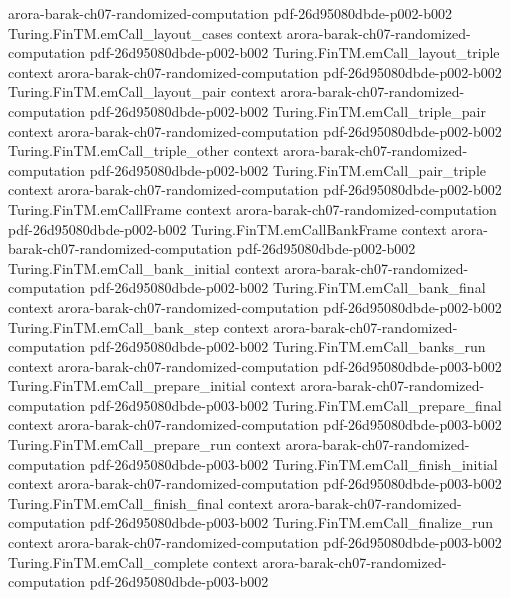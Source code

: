 \begin{theorem}
  {arora-barak-ch07-randomized-computation}
  {pdf-26d95080dbde-p002-b002}
\proofstep
  {Turing.FinTM.emCall_layout_cases}
  {context}
  {arora-barak-ch07-randomized-computation}
  {pdf-26d95080dbde-p002-b002}
\proofstep
  {Turing.FinTM.emCall_layout_triple}
  {context}
  {arora-barak-ch07-randomized-computation}
  {pdf-26d95080dbde-p002-b002}
\proofstep
  {Turing.FinTM.emCall_layout_pair}
  {context}
  {arora-barak-ch07-randomized-computation}
  {pdf-26d95080dbde-p002-b002}
\proofstep
  {Turing.FinTM.emCall_triple_pair}
  {context}
  {arora-barak-ch07-randomized-computation}
  {pdf-26d95080dbde-p002-b002}
\proofstep
  {Turing.FinTM.emCall_triple_other}
  {context}
  {arora-barak-ch07-randomized-computation}
  {pdf-26d95080dbde-p002-b002}
\proofstep
  {Turing.FinTM.emCall_pair_triple}
  {context}
  {arora-barak-ch07-randomized-computation}
  {pdf-26d95080dbde-p002-b002}
\proofstep
  {Turing.FinTM.emCallFrame}
  {context}
  {arora-barak-ch07-randomized-computation}
  {pdf-26d95080dbde-p002-b002}
\proofstep
  {Turing.FinTM.emCallBankFrame}
  {context}
  {arora-barak-ch07-randomized-computation}
  {pdf-26d95080dbde-p002-b002}
\proofstep
  {Turing.FinTM.emCall_bank_initial}
  {context}
  {arora-barak-ch07-randomized-computation}
  {pdf-26d95080dbde-p002-b002}
\proofstep
  {Turing.FinTM.emCall_bank_final}
  {context}
  {arora-barak-ch07-randomized-computation}
  {pdf-26d95080dbde-p002-b002}
\proofstep
  {Turing.FinTM.emCall_bank_step}
  {context}
  {arora-barak-ch07-randomized-computation}
  {pdf-26d95080dbde-p002-b002}
\proofstep
  {Turing.FinTM.emCall_banks_run}
  {context}
  {arora-barak-ch07-randomized-computation}
  {pdf-26d95080dbde-p003-b002}
\proofstep
  {Turing.FinTM.emCall_prepare_initial}
  {context}
  {arora-barak-ch07-randomized-computation}
  {pdf-26d95080dbde-p003-b002}
\proofstep
  {Turing.FinTM.emCall_prepare_final}
  {context}
  {arora-barak-ch07-randomized-computation}
  {pdf-26d95080dbde-p003-b002}
\proofstep
  {Turing.FinTM.emCall_prepare_run}
  {context}
  {arora-barak-ch07-randomized-computation}
  {pdf-26d95080dbde-p003-b002}
\proofstep
  {Turing.FinTM.emCall_finish_initial}
  {context}
  {arora-barak-ch07-randomized-computation}
  {pdf-26d95080dbde-p003-b002}
\proofstep
  {Turing.FinTM.emCall_finish_final}
  {context}
  {arora-barak-ch07-randomized-computation}
  {pdf-26d95080dbde-p003-b002}
\proofstep
  {Turing.FinTM.emCall_finalize_run}
  {context}
  {arora-barak-ch07-randomized-computation}
  {pdf-26d95080dbde-p003-b002}
\proofstep
  {Turing.FinTM.emCall_complete}
  {context}
  {arora-barak-ch07-randomized-computation}
  {pdf-26d95080dbde-p003-b002}

\end{theorem}
